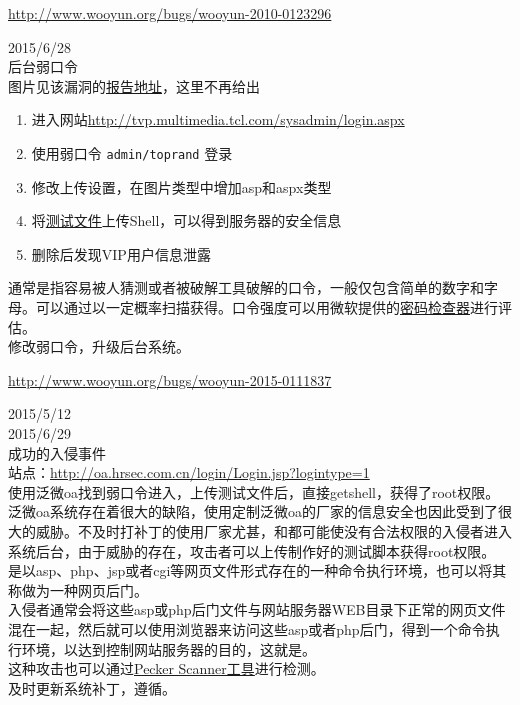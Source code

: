 \documentclass{leptc}
\begin{document}
\begin{center}
	\url{http://www.wooyun.org/bugs/wooyun-2010-0123296}
\end{center}
 2015/6/28\\
 后台弱口令 \\
 图片见该漏洞的\href{http://www.wooyun.org/bugs/wooyun-2010-0123296}{报告地址}，这里不再给出
\begin{enumerate}
	\item 进入网站\url{http://tvp.multimedia.tcl.com/sysadmin/login.aspx}
	\item
	使用弱口令 \verb|admin/toprand| 登录
	\item
	修改上传设置，在图片类型中增加asp和aspx类型
	\item
	将\href{http://tvp.multimedia.tcl.com/UploadFiles/Images/2015/6/20150628152911.aspx}{测试文件}上传Shell，可以得到服务器的安全信息
	\item
	删除后发现VIP用户信息泄露
\end{enumerate}

 通常是指容易被人猜测或者被破解工具破解的口令，一般仅包含简单的数字和字母。可以通过以一定概率扫描获得。口令强度可以用微软提供的\href{http://www.microsoft.com/zh-cn/security/pc-security/password-checker.aspx}{密码检查器}进行评估。\\
 修改弱口令，升级后台系统。\\

\begin{center}
	\url{http://www.wooyun.org/bugs/wooyun-2015-0111837}
\end{center}
 2015/5/12 \\
 2015/6/29 \\
 成功的入侵事件 \\
 站点：\url{http://oa.hrsec.com.cn/login/Login.jsp?logintype=1} \\
使用泛微oa找到弱口令进入，上传测试文件后，直接getshell，获得了root权限。\\
 泛微oa系统存在着很大的缺陷，使用定制泛微oa的厂家的信息安全也因此受到了很大的威胁。不及时打补丁的使用厂家尤甚，和都可能使没有合法权限的入侵者进入系统后台，由于威胁的存在，攻击者可以上传制作好的测试脚本获得root权限。\\
是以asp、php、jsp或者cgi等网页文件形式存在的一种命令执行环境，也可以将其称做为一种网页后门。\\
入侵者通常会将这些asp或php后门文件与网站服务器WEB目录下正常的网页文件混在一起，然后就可以使用浏览器来访问这些asp或者php后门，得到一个命令执行环境，以达到控制网站服务器的目的，这就是。\\
这种攻击也可以通过\href{https://github.com/cfc4n/pecker}{Pecker Scanner工具}进行检测。\\
 及时更新系统补丁，遵循。\\
\end{document}
